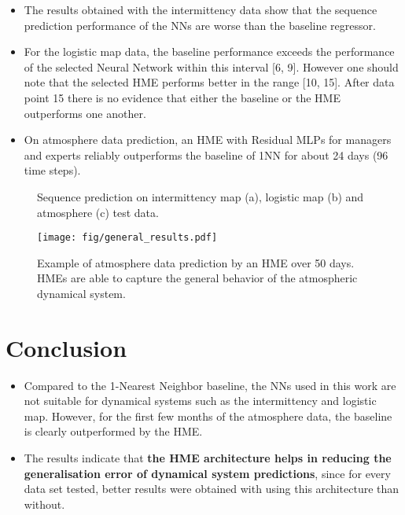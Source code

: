 \documentclass[a0, portrait]{IWIposter}
\begin{document}
\begin{multicols}{3}
\begin{itemize}
\item The results obtained with the intermittency data show that the sequence prediction performance of the NNs are worse than the baseline regressor.
\item For the logistic map data, the baseline performance exceeds the performance of the selected Neural Network within this interval [6, 9]. However one should note that the selected HME performs better in the range [10, 15]. After data point 15 there is no evidence that either the baseline or the HME outperforms one another.
\item On atmosphere data prediction, an HME with Residual MLPs for managers and experts reliably outperforms the baseline of 1NN for about 24 days (96 time steps).
\end{itemize}

\begin{figure}
\centering
\hspace*{0.35cm}
\caption{Sequence prediction on intermittency map (a), logistic map (b) and atmosphere (c) test data. }
\label{fig:plots}
\end{figure}

\begin{figure}
\centering
\texttt{[image: fig/general\_results.pdf]}
\caption{Example of atmosphere data prediction by an HME over 50 days. HMEs are able to capture the general behavior of the atmospheric dynamical system.}
\label{fig:genbehavior}
\end{figure}

\section*{Conclusion}
\begin{itemize}
\item Compared to the 1-Nearest Neighbor baseline, the NNs used in this work are not suitable for dynamical systems such as the intermittency and logistic map. However, for the first few months of the atmosphere data, the baseline is clearly outperformed by the HME. 
\item The results indicate that \textbf{the HME architecture helps in reducing the generalisation error of dynamical system predictions}, since for every data set tested, better results were obtained with using this architecture than without.
\end{itemize}



\end{multicols}
\end{document}
